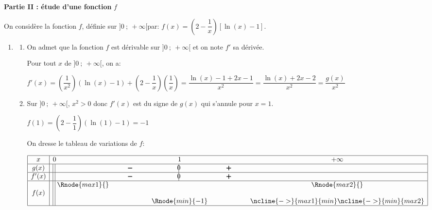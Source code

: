 
\bigskip

\textbf{Partie II : étude d'une fonction } \boldmath $f$\unboldmath

\medskip

On considère la fonction $f$, définie sur $]0~;~ +\infty[$par: $f(x) = \left(2 - \dfrac{1}{x}\right)[\ln (x) - 1]$.

\begin{enumerate}
\item 
	\begin{enumerate}
		\item On admet que la fonction $f$ est dérivable sur $]0~;~ +\infty[$ et on note $f'$ sa dérivée.



Pour tout $x$ de $]0~;~ +\infty[$, on a:

$f'(x) = \left (\dfrac{1}{x^2}\right )\left (\ln(x)-1\right ) + \left (2-\dfrac{1}{x}\right )\left (\dfrac{1}{x}\right )
= \dfrac{\ln(x)-1 +2x-1}{x^2}
= \dfrac{\ln(x)+2x-2}{x^2}
=\dfrac{g(x)}{x^2}$

		\item 
Sur $]0~;~ +\infty[$, $x^2>0$ donc $f'(x)$ est du signe de $g(x)$ qui s'annule pour $x=1$.

$f(1) = \left (2-\dfrac{1}{1}\right )\left (\ln(1)-1\right ) = -1$

On dresse le tableau de variations de $f$:

\begin{center}
{\renewcommand{\arraystretch}{1.3}
\def\esp{\hspace*{1.5cm}}
\def\hauteur{0pt}
$\begin{array}{|c| l *3{c} c|}
\hline
 x & 0 & \esp & 1 & \esp & +\infty \\
 \hline
g(x) & \vline\;\vline\; &  \pmb{-} & \vline\hspace{-2.7pt}0 & \pmb{+} & \\  
\hline
f'(x) &  \vline\;\vline\;  &  \pmb{-} & \vline\hspace{-2.7pt}0 & \pmb{+} & \\  
\hline
  & \vline\;\vline\;  \Rnode{max1}{}  &  &  &  & \Rnode{max2}{}   \\
f(x) & \vline\;\vline\;  &  & & &  \rule{0pt}{\hauteur} \\
 &  \vline\;\vline\;  & &   \Rnode{min}{-1} & & \rule{0pt}{\hauteur}
\ncline{->}{max1}{min} \ncline{->}{min}{max2}\\
\hline
\end{array}$
}
\end{center}		
		

\end{enumerate}
\end{enumerate}
